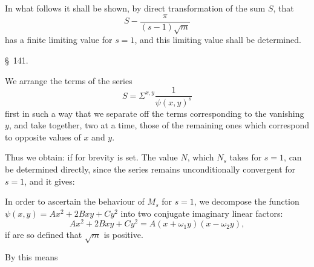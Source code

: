 In what follows it shall be shown, by direct transformation of the sum $S$,
that
\[ S - \frac{\pi}{(s-1)\sqrt{m}} \]
has a finite limiting value for $s=1$, and this limiting value
shall be determined.

\begin{center}
\S\ 141.\quad {}
\end{center}

We arrange the terms of the series
\[ S = \Sigma^{x,y}\frac{1}{\psi(x,y)^s} \]
first in such a way that we separate off the terms corresponding to the
vanishing $y$, and take together, two at a time, those of the remaining ones
which correspond to opposite values of $x$ and $y$.

Thus we obtain:
if for brevity
is set. The value $N$, which $N_s$ takes for $s=1$, can be determined
directly, since the series remains unconditionally convergent for $s=1$,
and it gives:

In order to ascertain the behaviour of $M_s$ for $s=1$, we decompose
the function $\psi(x,y) = Ax^2 + 2Bxy + Cy^2$ into two conjugate
imaginary linear factors:
\[ Ax^2 + 2Bxy + Cy^2 = A(x+\omega_1y)(x-\omega_2y), \]
if
are so defined that $\sqrt{m}$ is positive.

By this means
